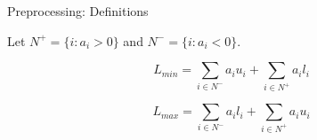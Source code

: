 \documentclass[aspectratio=169,xcolor=dvipsnames]{beamer}
\begin{document}
\begin{frame}{Preprocessing: Definitions}
    \begin{center}
        Let $N^+ = \{i : a_i > 0\}$ and $N^- = \{i : a_i < 0\}$.
        
        \vspace{0.3cm}
        
        \Large
        \[
        L_{min} = \sum_{i \in N^-} a_i u_i + \sum_{i \in N^+} a_i l_i
        \]
        
        \vspace{0.1cm}
        
        \[
        L_{max} = \sum_{i \in N^-} a_i l_i + \sum_{i \in N^+} a_i u_i
        \]
    \end{center}
\end{frame}
\end{document}
